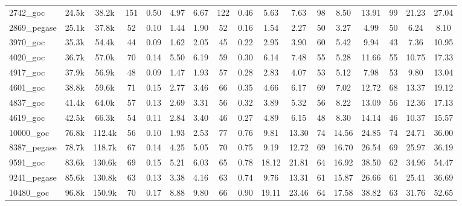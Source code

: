 \documentclass{standalone}
\begin{document}
\begin{tabular}{|l|c|c|cccc|cccc|ccc|ccc|}
2742\_goc 
&  24.5k
&  38.2k
& 151 
&  0.50
&  4.97
&  6.67
& 122 
&  0.46
&  5.63
&  7.63
& 98 
&  8.50
& 13.91
& 99 
& 21.23
& 27.04
\\

2869\_pegase 
&  25.1k
&  37.8k
& 52 
&  0.10
&  1.44
&  1.90
& 52 
&  0.16
&  1.54
&  2.27
& 50 
&  3.27
&  4.99
& 50 
&  6.24
&  8.10
\\
\hline
3970\_goc 
&  35.3k
&  54.4k
& 44 
&  0.09
&  1.62
&  2.05
& 45 
&  0.22
&  2.95
&  3.90
& 60 
&  5.42
&  9.94
& 43 
&  7.36
& 10.95
\\

4020\_goc 
&  36.7k
&  57.0k
& 70 
&  0.14
&  5.50
&  6.19
& 59 
&  0.30
&  6.14
&  7.48
& 55 
&  5.28
& 11.66
& 55 
& 10.75
& 17.33
\\

4917\_goc 
&  37.9k
&  56.9k
& 48 
&  0.09
&  1.47
&  1.93
& 57 
&  0.28
&  2.83
&  4.07
& 53 
&  5.12
&  7.98
& 53 
&  9.80
& 13.04
\\

4601\_goc 
&  38.8k
&  59.6k
& 71 
&  0.15
&  2.77
&  3.46
& 66 
&  0.35
&  4.66
&  6.17
& 69 
&  7.02
& 12.72
& 68 
& 13.37
& 19.12
\\

4837\_goc 
&  41.4k
&  64.0k
& 57 
&  0.13
&  2.69
&  3.31
& 56 
&  0.32
&  3.89
&  5.32
& 56 
&  8.22
& 13.09
& 56 
& 12.36
& 17.13
\\
\hline
4619\_goc 
&  42.5k
&  66.3k
& 54 
&  0.11
&  2.84
&  3.40
& 46 
&  0.27
&  4.89
&  6.15
& 48 
&  8.30
& 14.14
& 46 
& 10.37
& 15.57
\\

10000\_goc 
&  76.8k
& 112.4k
& 56 
&  0.10
&  1.93
&  2.53
& 77 
&  0.76
&  9.81
& 13.30
& 74 
& 14.56
& 24.85
& 74 
& 24.71
& 36.00
\\

8387\_pegase 
&  78.7k
& 118.7k
& 67 
&  0.14
&  4.25
&  5.05
& 70 
&  0.75
&  9.19
& 12.72
& 69 
& 16.70
& 26.54
& 69 
& 25.97
& 36.19
\\

9591\_goc 
&  83.6k
& 130.6k
& 69 
&  0.15
&  5.21
&  6.03
& 65 
&  0.78
& 18.12
& 21.81
& 64 
& 16.92
& 38.50
& 62 
& 34.96
& 54.47
\\

9241\_pegase 
&  85.6k
& 130.8k
& 63 
&  0.13
&  3.38
&  4.16
& 63 
&  0.74
&  9.76
& 13.31
& 61 
& 15.87
& 26.66
& 61 
& 25.41
& 36.69
\\
\hline
10480\_goc 
&  96.8k
& 150.9k
& 70 
&  0.17
&  8.88
&  9.80
& 66 
&  0.90
& 19.11
& 23.46
& 64 
& 17.58
& 38.82
& 63 
& 31.76
& 52.65
\\


\end{tabular}
\end{document}
